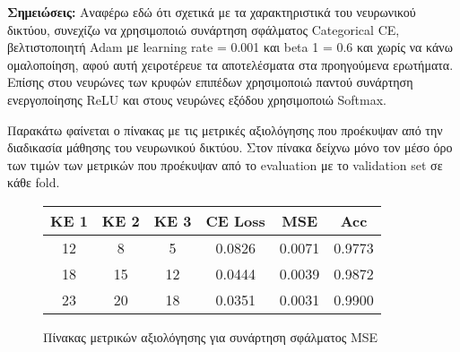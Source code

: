 \documentclass[12pt,a4paper]{article}
\begin{document}
\textbf{Σημειώσεις:}
Αναφέρω εδώ ότι σχετικά με τα χαρακτηριστικά του νευρωνικού δικτύου, συνεχίζω να χρησιμοποιώ συνάρτηση σφάλματος Categorical CE, βελτιστοποιητή Adam με learning rate = 0.001 και beta 1 = 0.6 και χωρίς να κάνω ομαλοποίηση, αφού αυτή χειροτέρευε τα αποτελέσματα στα προηγούμενα ερωτήματα. Επίσης στου νευρώνες των κρυφών επιπέδων χρησιμοποιώ παντού συνάρτηση ενεργοποίησης ReLU και στους νευρώνες εξόδου χρησιμοποιώ Softmax.

Παρακάτω φαίνεται ο πίνακας με τις μετρικές αξιολόγησης που προέκυψαν από την διαδικασία μάθησης του νευρωνικού δικτύου. Στον πίνακα δείχνω μόνο τον μέσο όρο των τιμών των μετρικών που προέκυψαν από το evaluation με το validation set σε κάθε fold.

\begin{figure}[H]
    \begin{center}
    \begin{tabular}{ |c|c|c|c|c|c| } 
        \hline
        \textbf{ΚΕ 1} & \textbf{ΚΕ 2} & \textbf{ΚΕ 3} & \textbf{CE Loss} & \textbf{MSE} & \textbf{Acc} \\ \hline
        12 & 8  & 5  & 0.0826 & 0.0071 & 0.9773 \\
        \hline
        18 & 15 & 12 & 0.0444 & 0.0039 & 0.9872 \\
        \hline
        23 & 20 & 18 & 0.0351 & 0.0031 & 0.9900 \\
        \hline
    \end{tabular}
    \end{center}
    \caption{Πίνακας μετρικών αξιολόγησης για συνάρτηση σφάλματος MSE}
\end{figure}
\end{document}
